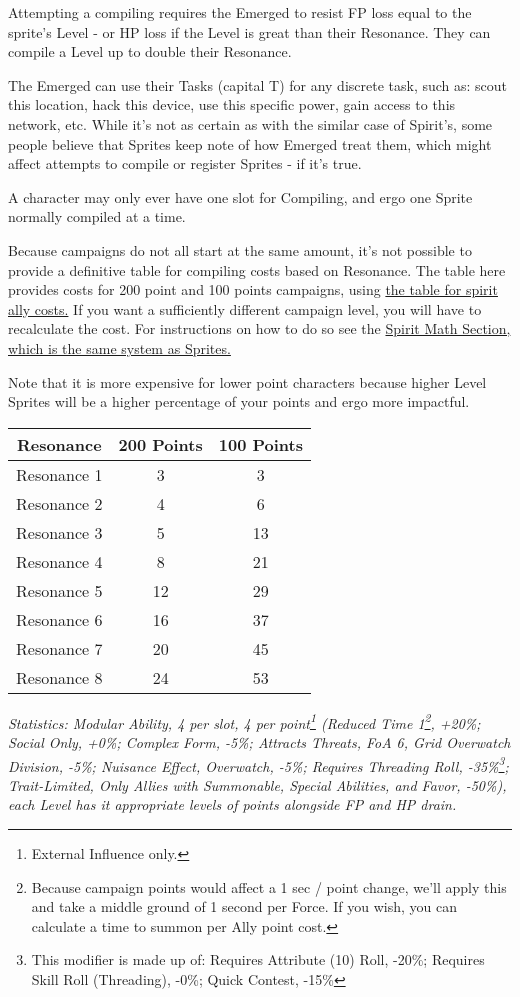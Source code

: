 \begin{multicols*}{3}
	Attempting a compiling requires the Emerged to resist FP loss equal to the sprite's Level - or HP loss if the Level is great than their Resonance. They can compile a Level up to double their Resonance.
	
	The Emerged can use their Tasks (capital T) for any discrete task, such as: scout this location, hack this device, use this specific power, gain access to this network, etc. While it's not as certain as with the similar case of Spirit's, some people believe that Sprites keep note of how Emerged treat them, which might affect attempts to compile or register Sprites - if it's true.
	
	A character may only ever have one slot for Compiling, and ergo one Sprite normally compiled at a time.
	
	Because campaigns do not all start at the same amount, it's not possible to provide a definitive table for compiling costs based on Resonance. The table here provides costs for 200 point and 100 points campaigns, using \hyperref[sprite_ally_cost]{the table for spirit ally costs.} If you want a sufficiently different campaign level, you will have to recalculate the cost. For instructions on how to do so see the \hyperref[spirit_math]{Spirit Math Section, which is the same system as Sprites.} 
	
	Note that it is more expensive for lower point characters because higher Level Sprites will be a higher percentage of your points and ergo more impactful.
	
	\begin{center}
		\begin{tabular}{|c|c|c|}
			\hline
			Resonance & 200 Points & 100 Points \\
			\hline
			\hline
			Resonance 1 & 3 & 3 \\
			Resonance 2 & 4 & 6 \\
			Resonance 3 & 5 & 13 \\
			Resonance 4 & 8 & 21 \\
			Resonance 5 & 12 & 29 \\
			Resonance 6 & 16 & 37 \\
			Resonance 7 & 20 & 45 \\
			Resonance 8 & 24 & 53 \\
			\hline
		\end{tabular}
	\end{center}	
	
	\textit{\textcolor{OliveGreen}{Statistics: Modular Ability, 4 per slot, 4 per point\footnote{External Influence only.} (Reduced Time 1\footnote{Because campaign points would affect a 1 sec / point change, we'll apply this and take a middle ground of 1 second per Force. If you wish, you can calculate a time to summon per Ally point cost.}, +20\%; Social Only, +0\%; Complex Form, -5\%; Attracts Threats, FoA 6, Grid Overwatch Division, -5\%; Nuisance Effect, Overwatch, -5\%; Requires Threading Roll, -35\%\footnote{This modifier is made up of: Requires Attribute (10) Roll, -20\%; Requires Skill Roll (Threading), -0\%; Quick Contest, -15\%}; Trait-Limited, Only Allies with Summonable, Special Abilities, and Favor, -50\%), each Level has it appropriate levels of points alongside FP and HP drain.}}


\end{multicols*}
